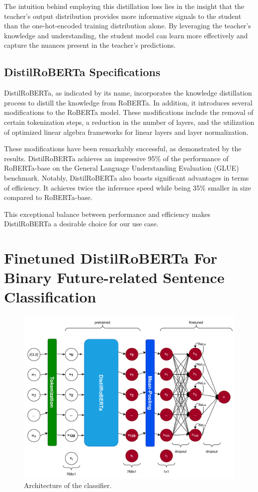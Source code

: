 \documentclass[a4paper,12pt]{report} %
\begin{document}
The intuition behind employing this distillation loss lies in the insight that the teacher's output distribution provides more informative signals to the student than the one-hot-encoded training distribution alone. By leveraging the teacher's knowledge and understanding, the student model can learn more effectively and capture the nuances present in the teacher's predictions.

\subsection{DistilRoBERTa Specifications} %
DistilRoBERTa, as indicated by its name, incorporates the knowledge distillation process to distill the knowledge from RoBERTa. In addition, it introduces several modifications to the RoBERTa model. These modifications include the removal of certain tokenization steps, a reduction in the number of layers, and the utilization of optimized linear algebra frameworks for linear layers and layer normalization.

These modifications have been remarkably successful, as demonstrated by the results. DistilRoBERTa achieves an impressive 95\% of the performance of RoBERTa-base on the General Language Understanding Evaluation (GLUE) benchmark. Notably, DistilRoBERTa also boasts significant advantages in terms of efficiency. It achieves twice the inference speed while being 35\% smaller in size compared to RoBERTa-base. 

This exceptional balance between performance and efficiency makes DistilRoBERTa a desirable choice for our use case.

\section{Finetuned DistilRoBERTa For Binary Future-related Sentence Classification}
\begin{figure}
  \centering
  \includegraphics[width=15cm]{img/classifier_archi.pdf}
  \caption{Architecture of the classifier.}
  \label{fig:classifier_archi}
\end{figure}
\end{document}
